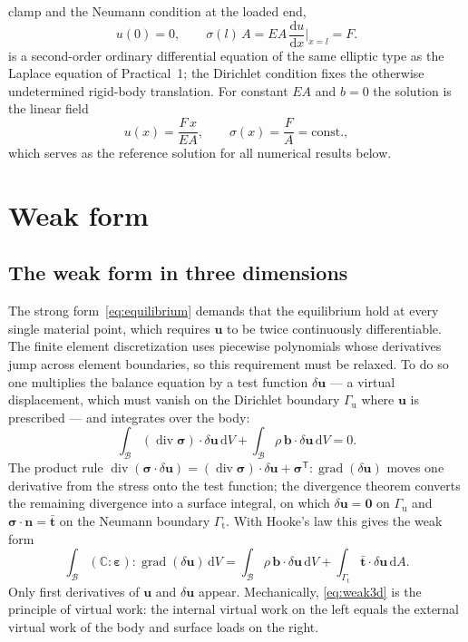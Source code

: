 \documentclass[11pt,a4paper]{article}
\numberwithin{equation}{section}
\theoremstyle{remark}
\newcommand{\dv}{\operatorname{div}}
\newcommand{\bu}{\bm{u}}
\newcommand{\bt}{\bm{t}}
\newcommand{\bn}{\bm{n}}
\newcommand{\bb}{\bm{b}}
\newcommand{\bsig}{\bm{\sigma}}
\newcommand{\beps}{\bm{\varepsilon}}
\newcommand{\CC}{\mathbb{C}}
\begin{document}
clamp and the Neumann condition at the loaded end,
\begin{equation}\label{eq:barbc}
  u(0) = 0,
  \qquad
  \sigma(l)\,A = EA\,\frac{\mathrm{d}u}{\mathrm{d}x}\bigg|_{x=l} = F.
\end{equation}
 is a second-order ordinary differential equation of the same elliptic
type as the Laplace equation of Practical~1; the Dirichlet condition fixes the otherwise
undetermined rigid-body translation. For constant $EA$ and $b = 0$ the solution is the
linear field
\begin{equation}\label{eq:analytic}
  u(x) = \frac{F\,x}{EA},
  \qquad
  \sigma(x) = \frac{F}{A} = \text{const.},
\end{equation}
which serves as the reference solution for all numerical results below.

\section{Weak form}\label{sec:weak}

\subsection{The weak form in three dimensions}\label{sec:weak3d}

The strong form~\eqref{eq:equilibrium} demands that the equilibrium hold at every single
material point, which requires $\bu$ to be twice continuously differentiable. The finite
element discretization uses piecewise polynomials whose derivatives jump across element
boundaries, so this requirement must be relaxed. To do so one multiplies the balance
equation by a test function $\delta\bu$ --- a virtual displacement, which must vanish on
the Dirichlet boundary $\Gamma_{\mathrm{u}}$ where $\bu$ is prescribed --- and integrates
over the body:
\begin{equation}\label{eq:weak-start}
  \int_{\mathcal{B}} \left(\dv\bsig\right)\cdot\delta\bu \,\mathrm{d}V
  + \int_{\mathcal{B}} \rho\,\bb\cdot\delta\bu \,\mathrm{d}V = 0.
\end{equation}
The product rule $\dv(\bsig\cdot\delta\bu) = (\dv\bsig)\cdot\delta\bu
+ \bsig^{\mathsf{T}} : \operatorname{grad}(\delta\bu)$ moves one derivative from the stress
onto the test function; the divergence theorem converts the remaining divergence into a
surface integral, on which $\delta\bu = \bm{0}$ on $\Gamma_{\mathrm{u}}$ and
$\bsig\cdot\bn = \bar{\bt}$ on the Neumann boundary $\Gamma_{\mathrm{t}}$. With Hooke's
law this gives the weak form
\begin{equation}\label{eq:weak3d}
  \int_{\mathcal{B}} \left(\CC:\beps\right) : \operatorname{grad}(\delta\bu)\,\mathrm{d}V
  = \int_{\mathcal{B}} \rho\,\bb\cdot\delta\bu\,\mathrm{d}V
  + \int_{\Gamma_{\mathrm{t}}} \bar{\bt}\cdot\delta\bu\,\mathrm{d}A .
\end{equation}
Only first derivatives of $\bu$ and $\delta\bu$ appear. Mechanically, \eqref{eq:weak3d} is
the principle of virtual work: the internal virtual work on the left equals the external
virtual work of the body and surface loads on the right.
\end{document}
